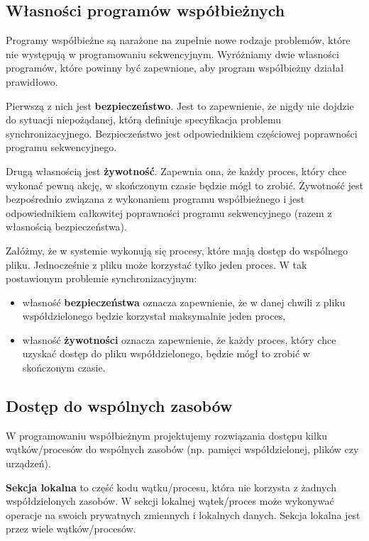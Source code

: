 \subsection{Własności programów współbieżnych}

Programy współbieżne są narażone na zupełnie nowe rodzaje problemów, które nie występują w programowaniu sekwencyjnym. Wyróżniamy dwie własności programów, które powinny być zapewnione, aby program współbieżny działał prawidłowo.

Pierwszą z nich jest \textbf{bezpieczeństwo}. Jest to zapewnienie, że nigdy nie dojdzie do sytuacji niepożądanej, którą definiuje specyfikacja problemu synchronizacyjnego. Bezpieczeństwo jest odpowiednikiem częściowej poprawności programu sekwencyjnego.

Drugą własnością jest \textbf{żywotność}. Zapewnia ona, że każdy proces, który chce wykonać pewną akcję, w skończonym czasie będzie mógł to zrobić. Żywotność jest bezpośrednio związana z wykonaniem programu współbieżnego i jest odpowiednikiem całkowitej poprawności programu sekwencyjnego (razem z własnością bezpieczeństwa).

\begin{example}
    Załóżmy, że w systemie wykonują się procesy, które mają dostęp do wspólnego pliku. Jednocześnie z pliku może korzystać tylko jeden proces. W tak postawionym problemie synchronizacyjnym:
    \begin{itemize}
        \item własność \textbf{bezpieczeństwa} oznacza zapewnienie, że w danej chwili z pliku współdzielonego będzie korzystał maksymalnie jeden proces,
        \item własność \textbf{żywotności} oznacza zapewnienie, że każdy proces, który chce uzyskać dostęp do pliku współdzielonego, będzie mógł to zrobić w skończonym czasie.
    \end{itemize}
\end{example}

\subsection{Dostęp do wspólnych zasobów}

W programowaniu współbieżnym projektujemy rozwiązania dostępu kilku wątków/procesów do wspólnych zasobów (np. pamięci współdzielonej, plików czy urządzeń).

\textbf{Sekcja lokalna} to część kodu wątku/procesu, która nie korzysta z żadnych współdzielonych zasobów. W sekcji lokalnej wątek/proces może wykonywać operacje na swoich prywatnych zmiennych i lokalnych danych. Sekcja lokalna jest  przez wiele wątków/procesów.


